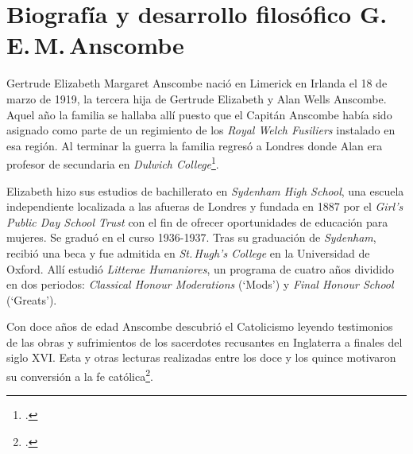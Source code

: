 \section{Biografía y desarrollo filosófico G.\,E.\,M.\,Anscombe}

Gertrude Elizabeth Margaret Anscombe nació en Limerick en Irlanda el 18 de marzo de 1919, la tercera hija de Gertrude Elizabeth y Alan Wells Anscombe. Aquel año la familia se hallaba allí puesto que el Capitán Anscombe había sido asignado como parte de un regimiento de los \emph{Royal Welch Fusiliers} instalado en esa región. Al terminar la guerra la familia regresó a Londres donde Alan era profesor de secundaria en \emph{Dulwich College}\footcite[Cf.][31]{teichman2002fellows}.

Elizabeth hizo sus estudios de bachillerato en \emph{Sydenham High School}, una escuela independiente localizada a las afueras de Londres y fundada en 1887 por el \emph{Girl's Public Day School Trust} con el fin de ofrecer oportunidades de educación para mujeres. Se graduó en el curso 1936-1937. Tras su graduación de \emph{Sydenham}, recibió una beca y fue admitida en \emph{St.\,Hugh's College} en la Universidad de Oxford. Allí estudió \emph{Litterae Humaniores}, un programa de cuatro años dividido en dos periodos: \emph{Classical Honour Moderations} (`Mods') y \emph{Final Honour School} (`Greats').

Con doce años de edad Anscombe descubrió el Catolicismo leyendo testimonios de las obras y sufrimientos de los sacerdotes recusantes en Inglaterra a finales del siglo XVI. Esta y otras lecturas realizadas entre los doce y los quince motivaron su conversión a la fe católica\footcite[Cf.][33]{teichman2002fellows}.

